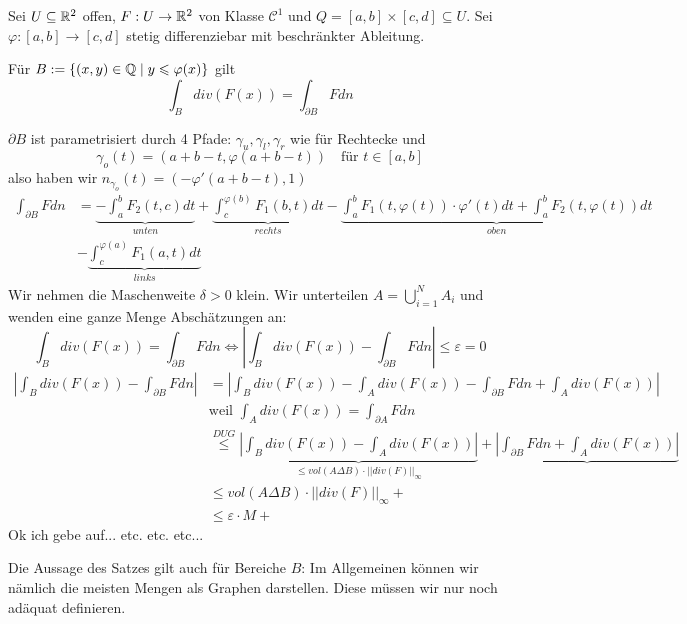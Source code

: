 \documentclass[main.tex]{subfiles}
\begin{document}
\begin{Theorem}
  Sei $U \subseteq \mathbb{R}^2$ offen, $F: U \to \mathbb{R}^2$ von Klasse $\mathcal{C}^1$ und $Q = [a,b] \times [c,d] \subseteq U$. Sei $\varphi: [a,b] \to [c,d]$ stetig differenziebar mit beschränkter Ableitung.

  Für $B := \{(x,y) \in \mathbb{Q} \mid y \leqslant \varphi(x)\}$ gilt
  $$\int_B div(F(x)) = \int_{\partial B} F dn$$
\end{Theorem}

\begin{Beweis}
  $\partial B$ ist parametrisiert durch 4 Pfade: $\gamma_u,\gamma_l,\gamma_r$ wie für Rechtecke und
  $$\gamma_o(t) = (a+b-t,\varphi(a+b-t)) \quad \text{für $t \in [a,b]$}$$
  also haben wir $n_{\gamma_o}(t) = (-\varphi'(a+b-t),1)$
  $$\begin{aligned}
    \int_{\partial B} F dn & = \underbrace{-\int_a^b F_2(t,c)dt}_{unten} + \underbrace{\int_c^{\varphi(b)} F_1(b,t)dt}_{rechts} - \underbrace{\int_a^b F_1(t,\varphi(t)) \cdot \varphi'(t)dt + \int_a^b F_2 (t,\varphi(t))dt}_{oben} \\
    & - \underbrace{\int_c^{\varphi(a)} F_1(a,t)dt}_{links}
  \end{aligned}$$
  Wir nehmen die Maschenweite $\delta > 0$ klein. Wir unterteilen $A = \bigcup \limits_{i=1}^N A_i$ und wenden eine ganze Menge Abschätzungen an:
  $$\int_B div(F(x)) = \int_{\partial B} F dn \Leftrightarrow \left|\int_B div(F(x)) - \int_{\partial B} F dn \right| \leq \varepsilon = 0$$
  $$\begin{aligned}
    \left|\int_B div(F(x)) - \int_{\partial B} F dn \right| & = \left|\int_B div(F(x)) - \int_A div(F(x)) - \int_{\partial B} F dn + \int_A div(F(x)) \right| \\
    & \text{weil } \int_A div(F(x)) = \int_{\partial A} F dn \\
    & \stackrel{\scriptscriptstyle DUG}{\leq} \underbrace{\left|\int_B div(F(x)) - \int_A div(F(x))\right|}_{\leq vol(A \Delta B) \cdot ||div(F)||_\infty} + \underbrace{\left| \int_{\partial B} F dn + \int_A div(F(x)) \right|}_{} \\
    & \leq vol(A \Delta B) \cdot ||div(F)||_\infty + \\
    & \leq \varepsilon \cdot M +
  \end{aligned}$$
  Ok ich gebe auf... etc. etc. etc...
\end{Beweis}

\begin{Bemerkung}
  Die Aussage des Satzes gilt auch für Bereiche $B$: Im Allgemeinen können wir nämlich die meisten Mengen als Graphen darstellen. Diese müssen wir nur noch adäquat definieren.
\end{Bemerkung}
\end{document}
